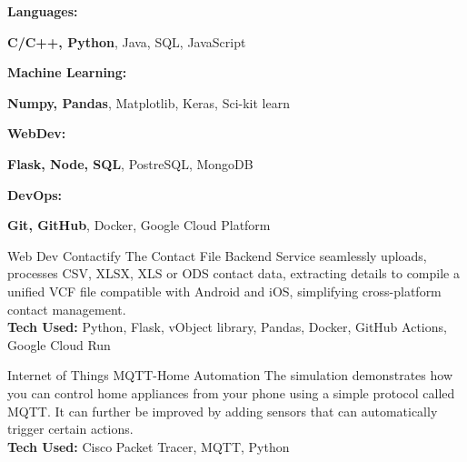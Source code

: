 \documentclass[9pt]{developercv}
\begin{document}
\vspace{-5pt}
\vspace{-10pt}

\begin{minipage}[t]{0.2\textwidth}
  \textbf{Languages:}
\end{minipage}
\hfill
\begin{minipage}[t]{0.73\textwidth}
  \textbf{C/C++, Python}, Java, SQL, JavaScript
\end{minipage}
\vspace{2mm}

\begin{minipage}[t]{0.2\textwidth}
  \textbf{Machine Learning:}
\end{minipage}
\hfill
\begin{minipage}[t]{0.73\textwidth}
  \textbf{Numpy, Pandas}, Matplotlib, Keras, Sci-kit learn
\end{minipage}
\vspace{2mm}

\begin{minipage}[t]{0.2\textwidth}
  \textbf{WebDev:}
\end{minipage}
\hfill
\begin{minipage}[t]{0.73\textwidth}
  \textbf{Flask, Node, SQL}, PostreSQL, MongoDB
\end{minipage}
\vspace{2mm}

\begin{minipage}[t]{0.2\textwidth}
  \textbf{DevOps:}
\end{minipage}
\hfill
\begin{minipage}[t]{0.735\textwidth}
  \textbf{Git, GitHub}, Docker, Google Cloud Platform
\end{minipage}



\vspace{-5pt}
\vspace{-6pt}
\begin{entrylist}
  \entry
  {Web Dev}
  {Contactify}
  {}
  {The Contact File Backend Service seamlessly uploads, processes CSV, XLSX, XLS or ODS contact data,   extracting
    details to compile a unified VCF file compatible with Android and iOS, simplifying cross-platform contact management.\\
    \textbf{Tech Used: } Python, Flask, vObject library, Pandas, Docker, GitHub Actions, Google Cloud Run
  }

  \entry
  {Internet of Things}
  {MQTT-Home Automation}
  {}
  {The simulation demonstrates how you can control home appliances from your phone using a simple protocol called MQTT. It can further be improved by adding sensors that can automatically trigger certain actions.\\
    \textbf{Tech Used: } Cisco Packet Tracer, MQTT, Python
  }

\end{entrylist}
\end{document}
